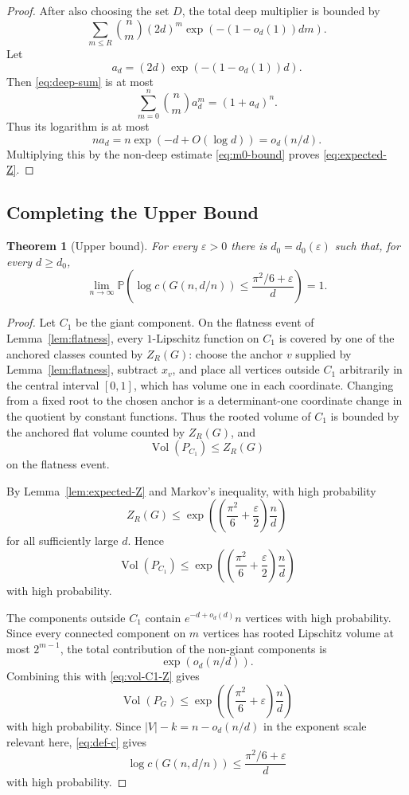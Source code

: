 \documentclass[11pt]{article}
\newtheorem{theorem}{Theorem}[section]
\theoremstyle{definition}
\DeclareMathOperator{\Vol}{Vol}
\newcommand{\PP}{\mathbb{P}}
\newcommand{\eps}{\varepsilon}
\begin{document}
\begin{proof}
\bigskip
\noindent
After also choosing the set $D$, the total deep multiplier is bounded by
\begin{equation}\label{eq:deep-sum}
  \sum_{m\le R}\binom{n}{m}(2d)^m\exp(-(1-o_d(1))dm).
\end{equation}
Let
\[
  a_d=(2d)\exp(-(1-o_d(1))d).
\]
Then \eqref{eq:deep-sum} is at most
\[
  \sum_{m=0}^n\binom{n}{m}a_d^m=(1+a_d)^n.
\]
Thus its logarithm is at most
\[
  na_d=n\exp(-d+O(\log d))=o_d(n/d).
\]
Multiplying this by the non-deep estimate \eqref{eq:m0-bound} proves \eqref{eq:expected-Z}.
\end{proof}

\subsection{Completing the Upper Bound}

\begin{theorem}[Upper bound]\label{thm:upper}
For every $\eps>0$ there is $d_0=d_0(\eps)$ such that, for every $d\ge d_0$,
\[
  \lim_{n\to\infty}\PP\left(
  \log c(G(n,d/n))\le\frac{\pi^2/6+\eps}{d}
  \right)=1.
\]
\end{theorem}

\begin{proof}
Let $C_1$ be the giant component.  On the flatness event of Lemma~\ref{lem:flatness}, every $1$-Lipschitz function on $C_1$ is covered by one of the anchored classes counted by $Z_R(G)$: choose the anchor $v$ supplied by Lemma~\ref{lem:flatness}, subtract $x_v$, and place all vertices outside $C_1$ arbitrarily in the central interval $[0,1]$, which has volume one in each coordinate.  Changing from a fixed root to the chosen anchor is a determinant-one coordinate change in the quotient by constant functions.  Thus the rooted volume of $C_1$ is bounded by the anchored flat volume counted by $Z_R(G)$, and
\begin{equation}\label{eq:vol-C1-Z}
  \Vol(P_{C_1})\le Z_R(G)
\end{equation}
on the flatness event.

\bigskip
\noindent
By Lemma~\ref{lem:expected-Z} and Markov's inequality, with high probability
\[
  Z_R(G)\le
  \exp\left(\left(\frac{\pi^2}{6}+\frac{\eps}{2}\right)\frac nd\right)
\]
for all sufficiently large $d$.  Hence
\[
  \Vol(P_{C_1})\le
  \exp\left(\left(\frac{\pi^2}{6}+\frac{\eps}{2}\right)\frac nd\right)
\]
with high probability.

\bigskip
\noindent
The components outside $C_1$ contain $e^{-d+o_d(d)}n$ vertices with high probability.  Since every connected component on $m$ vertices has rooted Lipschitz volume at most $2^{m-1}$, the total contribution of the non-giant components is
\[
  \exp(o_d(n/d)).
\]
Combining this with \eqref{eq:vol-C1-Z} gives
\[
  \Vol(P_G)\le
  \exp\left(\left(\frac{\pi^2}{6}+\eps\right)\frac nd\right)
\]
with high probability.  Since $|V|-k=n-o_d(n/d)$ in the exponent scale relevant here, \eqref{eq:def-c} gives
\[
  \log c(G(n,d/n))\le\frac{\pi^2/6+\eps}{d}
\]
with high probability.
\end{proof}
\end{document}
